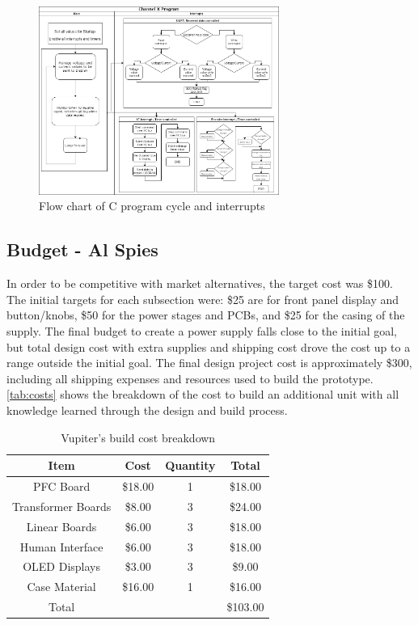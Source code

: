 \documentclass[15pt]{article}
\begin{document}
\begin{figure}[H]
    \begin{center}
    \includegraphics[width=0.7\textwidth]{softflow}
    \end{center}
    \caption{Flow chart of C program cycle and interrupts}
    \label{fig:softflow}
\end{figure}
\subsection{Budget - Al Spies}
In order to be competitive with market alternatives, the target cost was \$100. The initial targets for each subsection were: \$25 are for front panel display and button/knobs, \$50 for the power stages and PCBs, and \$25 for the casing of the supply. The final budget to create a power supply falls close to the initial goal, but total design cost with extra supplies and shipping cost drove the cost up to a range outside the initial goal. The final design project cost is approximately \$300, including all shipping expenses and resources used to build the prototype. \autoref{tab:costs} shows the breakdown of the cost to build an additional unit with all knowledge learned through the design and build process.

\begin{table}[H]
    \centering
    \begin{tabular}{| c | c | c | c |}
    \hline
     \textbf{Item} & \textbf{Cost} & \textbf{Quantity} & \textbf{Total}\\
     \hline
     PFC Board & \$18.00 & 1 & \$18.00\\ 
     Transformer Boards & \$8.00 & 3 & \$24.00\\  
     Linear Boards & \$6.00 & 3 & \$18.00\\
     Human Interface & \$6.00 & 3 & \$18.00\\
     OLED Displays & \$3.00 & 3 & \$9.00\\
     Case Material & \$16.00 & 1 & \$16.00\\
     \hline
     \hline
     Total & & &\$103.00\\
     \hline


    \end{tabular}
    \caption{Vupiter's build cost breakdown}
    \label{tab:costs}
\end{table}
\end{document}

